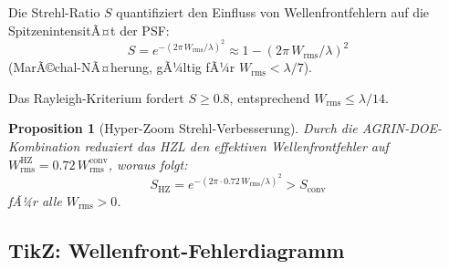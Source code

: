 ﻿\documentclass[12pt,a4paper]{article}
\newtheorem{proposition}[theorem]{Proposition}
\theoremstyle{definition}
\newcommand{\HZ}{\mathrm{HZ}}
\newcommand{\conv}{\mathrm{conv}}
\begin{document}
	Die Strehl-Ratio $S$ quantifiziert den Einfluss von Wellenfrontfehlern
	auf die SpitzenintensitÃ¤t der PSF:
	\begin{equation}
		S = e^{-(2\pi\,W_\mathrm{rms}/\lambda)^2}
		\approx 1 - (2\pi\,W_\mathrm{rms}/\lambda)^2
		\label{eq:strehl}
	\end{equation}
	(MarÃ©chal-NÃ¤herung, gÃ¼ltig fÃ¼r $W_\mathrm{rms} < \lambda/7$).
	
	Das Rayleigh-Kriterium fordert $S \geq 0.8$, entsprechend
	$W_\mathrm{rms} \leq \lambda/14$.
	
	\begin{proposition}[Hyper-Zoom Strehl-Verbesserung]
		Durch die AGRIN-DOE-Kombina\-tion reduziert das HZL den effektiven
		Wellenfrontfehler auf $W_\mathrm{rms}^\HZ = 0.72\,W_\mathrm{rms}^\conv$,
		woraus folgt:
		\begin{equation}
			S_\HZ = e^{-(2\pi\cdot 0.72\,W_\mathrm{rms}/\lambda)^2}
			> S_\conv
		\end{equation}
		fÃ¼r alle $W_\mathrm{rms} > 0$.
	\end{proposition}
	
	\subsection{TikZ: Wellenfront-Fehlerdiagramm}
	
\end{document}
